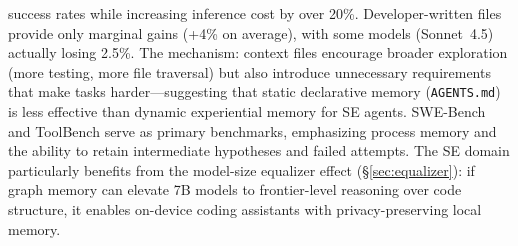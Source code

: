 \documentclass[hf]{ceurart}
\begin{document}
success rates while increasing inference cost by over 20\%.
Developer-written files provide only marginal gains (+4\% on average),
with some models (Sonnet~4.5) actually losing 2.5\%. The mechanism:
context files encourage broader exploration (more testing, more file
traversal) but also introduce unnecessary requirements that make
tasks harder---suggesting that static declarative memory
(\texttt{AGENTS.md}) is less effective than dynamic experiential
memory for SE agents.
SWE-Bench~\cite{swebench2024} and ToolBench serve as primary
benchmarks, emphasizing process memory and the ability to retain
intermediate hypotheses and failed attempts. The SE domain
particularly benefits from the model-size equalizer effect
(\S\ref{sec:equalizer}): if graph memory can elevate 7B models to
frontier-level reasoning over code structure, it enables on-device
coding assistants with privacy-preserving local memory.
\end{document}
